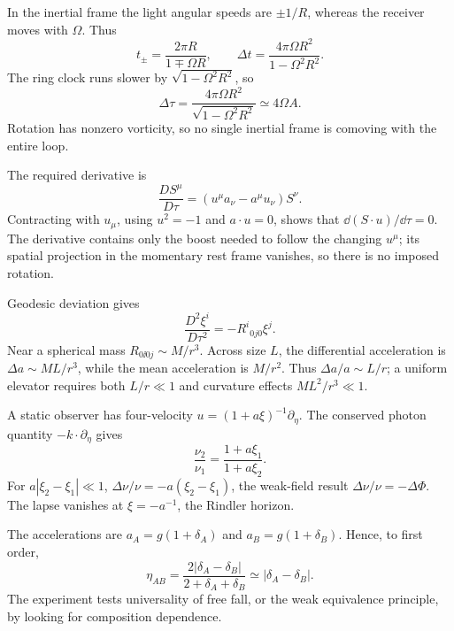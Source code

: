 \begin{solution}
In the inertial frame the light angular speeds are \(\pm1/R\), whereas the
receiver moves with \(\Omega\).  Thus
\[
t_\pm=\frac{2\pi R}{1\mp\Omega R},\qquad
\Delta t=\frac{4\pi\Omega R^2}{1-\Omega^2R^2}.
\]
The ring clock runs slower by \(\sqrt{1-\Omega^2R^2}\), so
\[
\Delta\tau=\frac{4\pi\Omega R^2}{\sqrt{1-\Omega^2R^2}}
\simeq4\Omega A.
\]
Rotation has nonzero vorticity, so no single inertial frame is comoving with
the entire loop.
\end{solution}

\begin{solution}
The required derivative is
\[
\frac{DS^\mu}{D\tau}
=(u^\mu a_\nu-a^\mu u_\nu)S^\nu.
\]
Contracting with \(u_\mu\), using \(u^2=-1\) and \(a\cdot u=0\), shows that
\(\dd(S\cdot u)/\dd\tau=0\).  The derivative contains only the boost needed
to follow the changing \(u^\mu\); its spatial projection in the momentary rest
frame vanishes, so there is no imposed rotation.
\end{solution}

\begin{solution}
Geodesic deviation gives
\[
\frac{D^2\xi^i}{D\tau^2}=-R^i{}_{0j0}\xi^j.
\]
Near a spherical mass \(R_{0\ii0j}\sim M/r^3\).  Across size \(L\), the
differential acceleration is \(\Delta a\sim ML/r^3\), while the mean
acceleration is \(M/r^2\).  Thus \(\Delta a/a\sim L/r\); a uniform elevator
requires both \(L/r\ll1\) and curvature effects \(ML^2/r^3\ll1\).
\end{solution}

\begin{solution}
A static observer has four-velocity
\(u=(1+a\xi)^{-1}\partial_\eta\).  The conserved photon quantity
\(-k\cdot\partial_\eta\) gives
\[
\frac{\nu_2}{\nu_1}=\frac{1+a\xi_1}{1+a\xi_2}.
\]
For \(a|\xi_2-\xi_1|\ll1\),
\(\Delta\nu/\nu=-a(\xi_2-\xi_1)\), the weak-field result
\(\Delta\nu/\nu=-\Delta\Phi\).  The lapse vanishes at
\(\xi=-a^{-1}\), the Rindler horizon.
\end{solution}

\begin{solution}
The accelerations are \(a_A=g(1+\delta_A)\) and
\(a_B=g(1+\delta_B)\).  Hence, to first order,
\[
\eta_{AB}
=\frac{2|\delta_A-\delta_B|}{2+\delta_A+\delta_B}
\simeq|\delta_A-\delta_B|.
\]
The experiment tests universality of free fall, or the weak equivalence
principle, by looking for composition dependence.
\end{solution}

